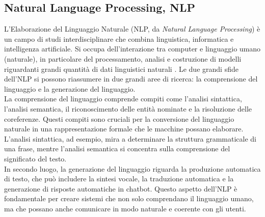 \documentclass[../../Thesis.tex]{subfiles}
\begin{document}
\subsection{Natural Language Processing, NLP}
L'Elaborazione del Linguaggio Naturale (NLP, da \emph{Natural Language Processing}) \`e un campo  di studi interdisciplinare che combina linguistica, informatica e intelligenza artificiale. Si occupa dell'interazione tra computer e linguaggio umano (naturale), in particolare del processamento, analisi e costruzione di modelli riguardanti grandi quantit\`a di dati linguistici naturali \cite{jurafsky2009speech}. 
Le due grandi sfide dell'NLP si possono riassumere in due grandi aree di ricerca: la comprensione del linguaggio e la generazione del linguaggio.\\
 La comprensione del linguaggio comprende compiti come l'analisi sintattica, l'analisi semantica, il riconoscimento delle entit\`a nominate e la risoluzione delle coreferenze. Questi compiti sono cruciali per la conversione del linguaggio naturale in una rappresentazione formale che le macchine possano elaborare. L'analisi sintattica, ad esempio, mira a determinare la struttura grammaticale di una frase, mentre l'analisi semantica si concentra sulla comprensione del significato del testo.\\ In secondo luogo, 
la generazione del linguaggio riguarda la produzione automatica di testo, che pu\`o includere la sintesi vocale, la traduzione automatica e la generazione di risposte automatiche in chatbot. Questo aspetto dell'NLP \`e fondamentale per creare sistemi che non solo comprendano il linguaggio umano, ma che possano anche comunicare in modo naturale e coerente con gli utenti.
\end{document}
